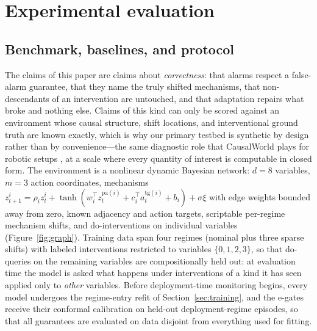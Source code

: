 \documentclass[preprint,12pt]{elsarticle}
\theoremstyle{definition}
\theoremstyle{remark}
\begin{document}
\section{Experimental evaluation}\label{sec:experiments}

\subsection{Benchmark, baselines, and protocol}

The claims of this paper are claims about \emph{correctness}: that
alarms respect a false-alarm guarantee, that they name the truly shifted
mechanisms, that non-descendants of an intervention are untouched, and
that adaptation repairs what broke and nothing else. Claims of this kind
can only be scored against an environment whose causal structure, shift
locations, and interventional ground truth are known exactly, which is
why our primary testbed is synthetic by design rather than by
convenience---the same diagnostic role that CausalWorld plays for
robotic setups \citep{ahmed2021causalworld}, at a scale where every
quantity of interest is computable in closed form. The environment is a
nonlinear dynamic Bayesian network:
$d=8$ variables, $m=3$ action coordinates, mechanisms
$z^i_{t+1}=\rho_i z^i_t+\tanh(w_i^\top z_t^{\mathrm{pa}(i)}
+c_i^\top a_t^{\mathrm{tg}(i)}+b_i)+\sigma\xi$ with edge weights bounded
away from zero, known adjacency and action targets, scriptable per-regime
mechanism shifts, and do-interventions on individual variables
(Figure~\ref{fig:graph}). Training data span four regimes (nominal plus
three sparse shifts) with labeled interventions restricted to variables
$\{0,1,2,3\}$, so that do-queries on the remaining variables are
compositionally held out: at evaluation time the model is asked what
happens under interventions of a kind it has seen applied only to
\emph{other} variables. Before deployment-time monitoring begins, every
model undergoes the regime-entry refit of Section~\ref{sec:training},
and the e-gates receive their conformal calibration on held-out
deployment-regime episodes, so that all guarantees are evaluated on data
disjoint from everything used for fitting.
\end{document}
